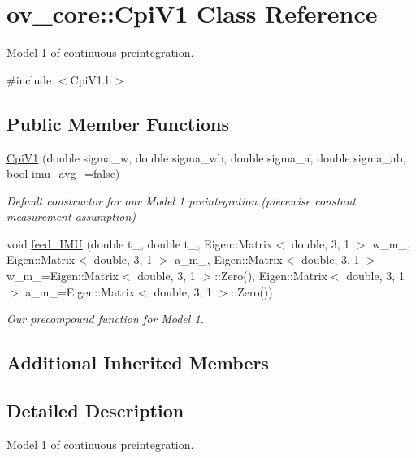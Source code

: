 \hypertarget{classov__core_1_1CpiV1}{}\section{ov\+\_\+core\+:\+:Cpi\+V1 Class Reference}
\label{classov__core_1_1CpiV1}


Model 1 of continuous preintegration.  




{\ttfamily \#include $<$Cpi\+V1.\+h$>$}

\subsection*{Public Member Functions}
\begin{DoxyCompactItemize}
\item 
\hyperlink{classov__core_1_1CpiV1_a34e803dec05d4a2e009ed170175d19d7}{Cpi\+V1} (double sigma\+\_\+w, double sigma\+\_\+wb, double sigma\+\_\+a, double sigma\+\_\+ab, bool imu\+\_\+avg\+\_\+=false)
\begin{DoxyCompactList}\small\item\em Default constructor for our Model 1 preintegration (piecewise constant measurement assumption) \end{DoxyCompactList}\item 
void \hyperlink{classov__core_1_1CpiV1_aafd93ac727dc176a9d5ca4b6d09d0cd2}{feed\+\_\+\+I\+MU} (double t\+\_, double t\+\_, Eigen\+::\+Matrix$<$ double, 3, 1 $>$ w\+\_\+m\+\_, Eigen\+::\+Matrix$<$ double, 3, 1 $>$ a\+\_\+m\+\_, Eigen\+::\+Matrix$<$ double, 3, 1 $>$ w\+\_\+m\+\_=Eigen\+::\+Matrix$<$ double, 3, 1 $>$\+::Zero(), Eigen\+::\+Matrix$<$ double, 3, 1 $>$ a\+\_\+m\+\_=Eigen\+::\+Matrix$<$ double, 3, 1 $>$\+::Zero())
\begin{DoxyCompactList}\small\item\em Our precompound function for Model 1. \end{DoxyCompactList}\end{DoxyCompactItemize}
\subsection*{Additional Inherited Members}


\subsection{Detailed Description}
Model 1 of continuous preintegration. 

